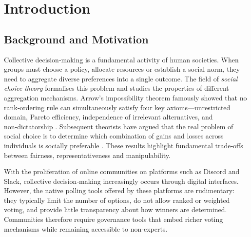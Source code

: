 \doublespacing %

\chapter{Introduction}
\label{ch:introduction}

\begin{spacing}{1} %
\minitoc %
\end{spacing} %
\thesisspacing %

\section{Background and Motivation}

Collective decision‐making is a fundamental activity of human societies.  When
groups must choose a policy, allocate resources or establish a social norm, they
need to aggregate diverse preferences into a single outcome.  The field of
\emph{social choice theory} formalises this problem and studies the properties of
different aggregation mechanisms.  Arrow’s impossibility theorem famously
showed that no rank‑ordering rule can simultaneously satisfy four key axioms—unrestricted domain, Pareto
efficiency, independence of irrelevant alternatives, and non‑dictatorship \cite{Arrow1951}.  Subsequent theorists have
argued that the real problem of social choice is to determine which
combination of gains and losses across individuals is socially
preferable \cite{Black1958, Okasha2011}.  These results highlight fundamental
trade‑offs between fairness, representativeness and manipulability.

With the proliferation of online communities on platforms such as Discord and
Slack, collective decision‑making increasingly occurs through digital
interfaces.  However, the native polling tools offered by these platforms are
rudimentary: they typically limit the number of options, do not allow ranked or
weighted voting, and provide little transparency about how winners are
determined.  Communities therefore require governance tools that embed richer
voting mechanisms while remaining accessible to non‑experts.

